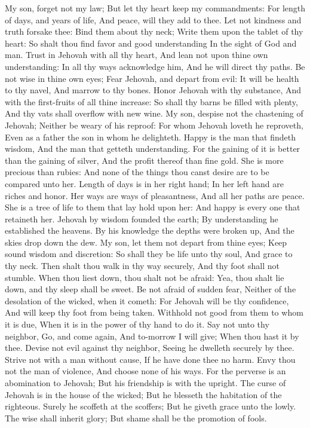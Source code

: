 My son, forget not my law; But let thy heart keep my commandments:  For length of days, and years of life, And peace, will they add to thee.  Let not kindness and truth forsake thee: Bind them about thy neck; Write them upon the tablet of thy heart:  So shalt thou find favor and good understanding In the sight of God and man.  Trust in Jehovah with all thy heart, And lean not upon thine own understanding:  In all thy ways acknowledge him, And he will direct thy paths.  Be not wise in thine own eyes; Fear Jehovah, and depart from evil:  It will be health to thy navel, And marrow to thy bones.  Honor Jehovah with thy substance, And with the first-fruits of all thine increase:  So shall thy barns be filled with plenty, And thy vats shall overflow with new wine.  My son, despise not the chastening of Jehovah; Neither be weary of his reproof:  For whom Jehovah loveth he reproveth, Even as a father the son in whom he delighteth.  Happy is the man that findeth wisdom, And the man that getteth understanding.  For the gaining of it is better than the gaining of silver, And the profit thereof than fine gold.  She is more precious than rubies: And none of the things thou canst desire are to be compared unto her.  Length of days is in her right hand; In her left hand are riches and honor.  Her ways are ways of pleasantness, And all her paths are peace.  She is a tree of life to them that lay hold upon her: And happy is every one that retaineth her.  Jehovah by wisdom founded the earth; By understanding he established the heavens.  By his knowledge the depths were broken up, And the skies drop down the dew.  My son, let them not depart from thine eyes; Keep sound wisdom and discretion:  So shall they be life unto thy soul, And grace to thy neck.  Then shalt thou walk in thy way securely, And thy foot shall not stumble.  When thou liest down, thou shalt not be afraid: Yea, thou shalt lie down, and thy sleep shall be sweet.  Be not afraid of sudden fear, Neither of the desolation of the wicked, when it cometh:  For Jehovah will be thy confidence, And will keep thy foot from being taken.  Withhold not good from them to whom it is due, When it is in the power of thy hand to do it.  Say not unto thy neighbor, Go, and come again, And to-morrow I will give; When thou hast it by thee.  Devise not evil against thy neighbor, Seeing he dwelleth securely by thee.  Strive not with a man without cause, If he have done thee no harm.  Envy thou not the man of violence, And choose none of his ways.  For the perverse is an abomination to Jehovah; But his friendship is with the upright.  The curse of Jehovah is in the house of the wicked; But he blesseth the habitation of the righteous.  Surely he scoffeth at the scoffers; But he giveth grace unto the lowly.  The wise shall inherit glory; But shame shall be the promotion of fools. 

